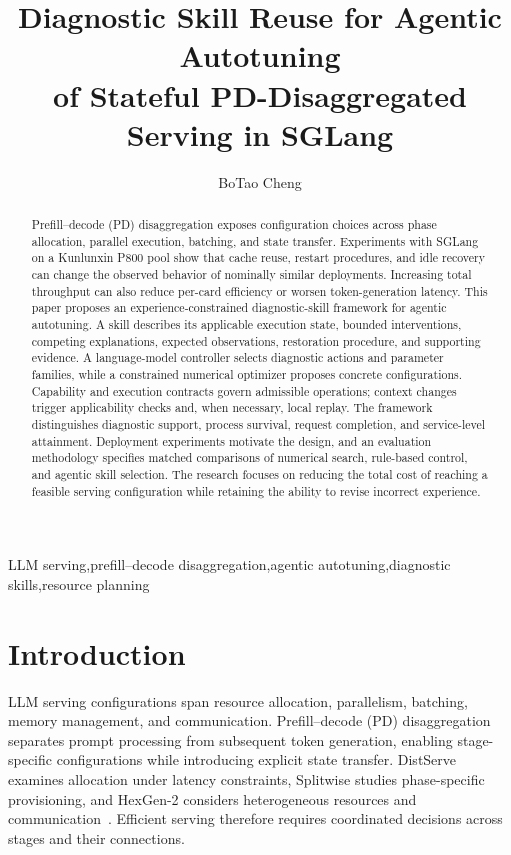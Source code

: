 \documentclass[preprint,12pt]{elsarticle}
\begin{document}
\begin{frontmatter}
\title{Diagnostic Skill Reuse for Agentic Autotuning\\of Stateful PD-Disaggregated Serving in SGLang}
\author{BoTao Cheng}
\address{Tencent}
\date{}


\begin{abstract}
Prefill--decode (PD) disaggregation exposes configuration choices across phase allocation, parallel execution, batching, and state transfer. Experiments with SGLang on a Kunlunxin P800 pool show that cache reuse, restart procedures, and idle recovery can change the observed behavior of nominally similar deployments. Increasing total throughput can also reduce per-card efficiency or worsen token-generation latency. This paper proposes an experience-constrained diagnostic-skill framework for agentic autotuning. A skill describes its applicable execution state, bounded interventions, competing explanations, expected observations, restoration procedure, and supporting evidence. A language-model controller selects diagnostic actions and parameter families, while a constrained numerical optimizer proposes concrete configurations. Capability and execution contracts govern admissible operations; context changes trigger applicability checks and, when necessary, local replay. The framework distinguishes diagnostic support, process survival, request completion, and service-level attainment. Deployment experiments motivate the design, and an evaluation methodology specifies matched comparisons of numerical search, rule-based control, and agentic skill selection. The research focuses on reducing the total cost of reaching a feasible serving configuration while retaining the ability to revise incorrect experience.

\end{abstract}

\begin{keyword}
LLM serving\sep prefill--decode disaggregation\sep agentic autotuning\sep diagnostic skills\sep resource planning
\end{keyword}
\end{frontmatter}

\section{Introduction}
LLM serving configurations span resource allocation, parallelism, batching, memory management, and communication. Prefill--decode (PD) disaggregation separates prompt processing from subsequent token generation, enabling stage-specific configurations while introducing explicit state transfer. DistServe examines allocation under latency constraints, Splitwise studies phase-specific provisioning, and HexGen-2 considers heterogeneous resources and communication~\cite{distserve2024,splitwise2024,hexgen2025}. Efficient serving therefore requires coordinated decisions across stages and their connections.
\end{document}
